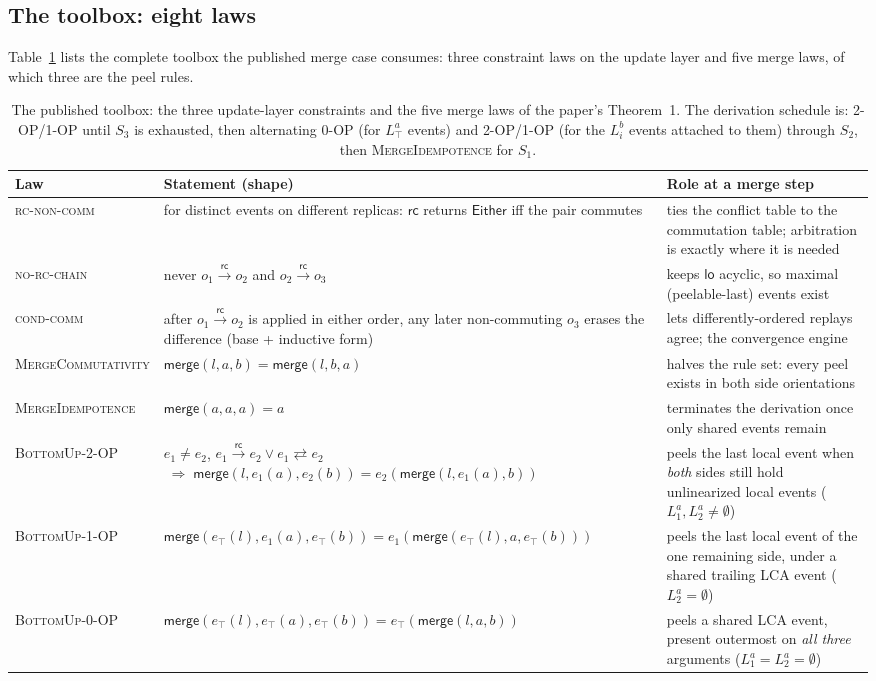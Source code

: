 \documentclass[11pt]{article}
\newcommand{\rc}{\xrightarrow{\mathsf{rc}}}
\newcommand{\rcrel}{\mathsf{rc}}
\newcommand{\comm}{\rightleftarrows}
\newcommand{\mergeL}{\mathsf{merge}}
\newcommand{\lopaper}{\mathsf{lo}}
\begin{document}
\subsection{The toolbox: eight laws}
\label{sec:toolbox}

Table~\ref{tab:toolbox} lists the complete toolbox the published merge
case consumes: three constraint laws on the update layer and five merge
laws, of which three are the peel rules.

\begin{table}[t]
\centering
\small
\begin{tabular}{@{}lp{5.9cm}p{5.3cm}@{}}
\toprule
Law & Statement (shape) & Role at a merge step \\
\midrule
\textsc{rc-non-comm} &
for distinct events on different replicas: $\rcrel$ returns
$\mathsf{Either}$ iff the pair commutes &
ties the conflict table to the commutation table; arbitration is
exactly where it is needed \\
\textsc{no-rc-chain} &
never $o_1 \rc o_2$ and $o_2 \rc o_3$ &
keeps $\lopaper$ acyclic, so maximal (peelable-last) events exist \\
\textsc{cond-comm} &
after $o_1 \rc o_2$ is applied in either order, any later
non-commuting $o_3$ erases the difference (base + inductive form) &
lets differently-ordered replays agree; the convergence engine \\
\addlinespace
\textsc{MergeCommutativity} &
$\mergeL(l,a,b) = \mergeL(l,b,a)$ &
halves the rule set: every peel exists in both side orientations \\
\textsc{MergeIdempotence} &
$\mergeL(a,a,a) = a$ &
terminates the derivation once only shared events remain \\
\addlinespace
\textsc{BottomUp-2-OP} &
$e_1 \neq e_2$, $e_1 \rc e_2 \vee e_1 \comm e_2$
$\;\Longrightarrow\;
\mergeL(l, e_1(a), e_2(b)) = e_2(\mergeL(l, e_1(a), b))$ &
peels the last local event when \emph{both} sides still hold
unlinearized local events ($L_1^a, L_2^a \neq \emptyset$) \\
\textsc{BottomUp-1-OP} &
$\mergeL(e_\top(l), e_1(a), e_\top(b)) =
e_1(\mergeL(e_\top(l), a, e_\top(b)))$ &
peels the last local event of the one remaining side, under a shared
trailing LCA event ($L_2^a = \emptyset$) \\
\textsc{BottomUp-0-OP} &
$\mergeL(e_\top(l), e_\top(a), e_\top(b)) = e_\top(\mergeL(l, a, b))$ &
peels a shared LCA event, present outermost on \emph{all three}
arguments ($L_1^a = L_2^a = \emptyset$) \\
\bottomrule
\end{tabular}
\caption{The published toolbox: the three update-layer constraints and
the five merge laws of the paper's Theorem~1. The derivation schedule
is: \textsc{2-OP}/\textsc{1-OP} until $S_3$ is exhausted, then
alternating \textsc{0-OP} (for $L_\top^a$ events) and
\textsc{2-OP}/\textsc{1-OP} (for the $L_i^b$ events attached to them)
through $S_2$, then \textsc{MergeIdempotence} for $S_1$.}
\label{tab:toolbox}
\end{table}
\end{document}
